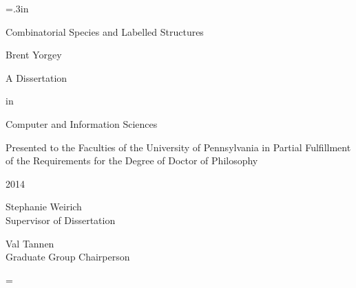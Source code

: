 \documentclass[12pt]{memoir}
\newif\ifdraft\drafttrue
\newcommand{\doublespaced}{\renewcommand{\baselinestretch}{2}\normalfont}
\newcommand{\singlespaced}{\renewcommand{\baselinestretch}{1}\normalfont}
\newcommand{\draftspaced}{\ifdraft\singlespaced\else\doublespaced\fi}
\numberwithin{equation}{section}
\def\thetitle{Combinatorial Species and Labelled Structures}
\def\theauthor{Brent Yorgey}
\def\theyear{2014}
\begin{document}
\doublespaced
\large\newlength{\oldparskip}\setlength\oldparskip{\parskip}\parskip=.3in
\thispagestyle{empty}
\begin{center}
\vspace*{\fill}
\thetitle

\theauthor


A Dissertation

in

Computer and Information Sciences
\end{center}


\noindent\singlespaced\large
Presented to the Faculties of the University of Pennsylvania in Partial
Fulfillment of the Requirements for the Degree of Doctor of Philosophy


\doublespaced\large
\begin{center}
\theyear
\end{center}


\noindent\makebox[0in][l]{\rule[2ex]{3in}{.3mm}}
\singlespaced
Stephanie Weirich\\
Supervisor of Dissertation


\noindent\makebox[0in][l]{\rule[2ex]{3in}{.3mm}}
\singlespaced
Val Tannen\\
Graduate Group Chairperson
\vspace*{\fill}

\normalsize\parskip=\oldparskip





\newpage
\tableofcontents

\newpage
\draftspaced
{}


\setcounter{chapter}{-1}








\end{document}
